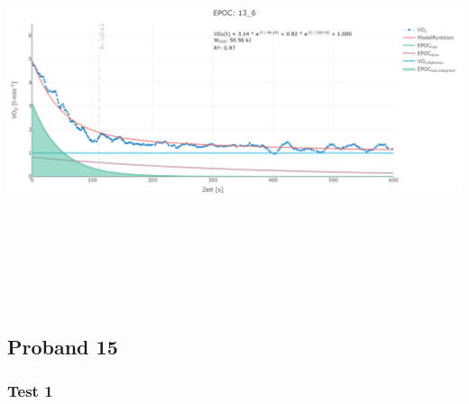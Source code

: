 \documentclass[
  letterpaper,
  DIV=11]{scrartcl}
\begin{document}
\includegraphics[width=11.45833in,height=4.6875in]{images/13_6.png}

\subsection{Proband 15}

\subsubsection{Test 1}
\end{document}
